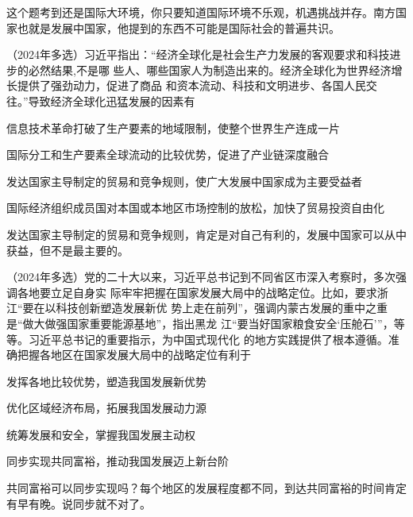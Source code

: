 \documentclass[lang=cn,newtx,10pt,scheme=chinese,pad,twocol]{zznote}
\begin{document}
\begin{solution}
	这个题考到还是国际大环境，你只要知道国际环境不乐观，机遇挑战并存。南方国家也就是发展中国家，他提到的东西不可能是国际社会的普遍共识。
\end{solution}
\begin{example}	（2024年多选）习近平指出：“经济全球化是社会生产力发展的客观要求和科技进步的必然结果,不是哪 些人、哪些国家人为制造出来的。经济全球化为世界经济增长提供了强劲动力，促进了商品 和资本流动、科技和文明进步、各国人民交往。”导致经济全球化迅猛发展的因素有

	\begin{choice}
		\item 信息技术革命打破了生产要素的地域限制，使整个世界生产连成一片
		\item 国际分工和生产要素全球流动的比较优势，促进了产业链深度融合
		\item 发达国家主导制定的贸易和竞争规则，使广大发展中国家成为主要受益者
		\item 国际经济组织成员国对本国或本地区市场控制的放松，加快了贸易投资自由化
	\end{choice}
\end{example}
\begin{solution}
	发达国家主导制定的贸易和竞争规则，肯定是对自己有利的，发展中国家可以从中获益，但不是最主要的。
\end{solution}
\begin{example} （2024年多选）党的二十大以来，习近平总书记到不同省区市深入考察时，多次强调各地要立足自身实 际牢牢把握在国家发展大局中的战略定位。比如，要求浙江“要在以科技创新塑造发展新优 势上走在前列”，强调内蒙古发展的重中之重是“做大做强国家重要能源基地”，指出黑龙 江“要当好国家粮食安全‘压舱石’”，等等。习近平总书记的重要指示，为中国式现代化 的地方实践提供了根本遵循。准确把握各地区在国家发展大局中的战略定位有利于
	\begin{choice}
		\item 发挥各地比较优势，塑造我国发展新优势
		\item 优化区域经济布局，拓展我国发展动力源
		\item  统筹发展和安全，掌握我国发展主动权
		\item 同步实现共同富裕，推动我国发展迈上新台阶
	\end{choice}
\end{example}
\begin{solution}
	共同富裕可以同步实现吗？每个地区的发展程度都不同，到达共同富裕的时间肯定有早有晚。说同步就不对了。
\end{solution}
\end{document}
